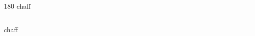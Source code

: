 
\begin{frame}
\begin{center}
\begin{turn}{180}
{\fontsize{2.5cm}{1em}\selectfont chaff}
\end{turn}
\vspace{1em}\par  
\hrule
\vspace{1em}\par  
{\fontsize{2.5cm}{1em}\selectfont chaff}
\end{center}
\end{frame}

